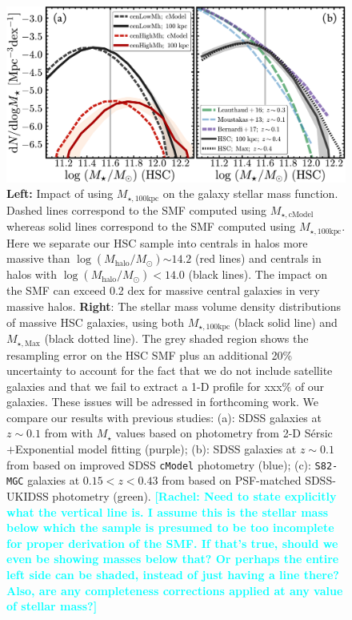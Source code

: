 \documentclass[a4paper,fleqn,usenatbib]{mnras}
\def\ser{{S\'{e}rsic\ }}
\def\mstar{{$M_{\star}$}}
\def\logmh{{$\log (M_{\mathrm{halo}}/M_{\odot})$}}
\def\mtot{{$M_{\star,100\mathrm{kpc}}$}}
\def\mmax{{$M_{\star,\mathrm{Max}}$}}
\def\mcmodel{{$M_{\star,\mathrm{cModel}}$}}
\newcommand{\rachel}[1]{\textcolor{cyan}{\textbf{[Rachel: #1]}}}
\begin{document}
  \begin{figure}
      \centering 
      \includegraphics[width=\textwidth]{fig/redbcg_mass_smf}
      \caption{
          \textbf{Left:} Impact of using \mtot{} on the galaxy stellar mass function. 
          Dashed lines correspond to the SMF computed using \mcmodel{} whereas solid 
          lines correspond to the SMF computed using \mtot{}. 
          Here we separate our HSC sample into  centrals in halos more massive than
          \logmh{}$\sim14.2$ (red lines) and centrals in halos with \logmh{}$<14.0$ 
          (black lines).
          The impact on the SMF can exceed 0.2 dex for massive central galaxies in 
          very massive halos.
          \textbf{Right}: The stellar mass volume density distributions of massive 
          HSC galaxies, using both \mtot{} (black solid line) and \mmax{} (black dotted 
          line).  
          The grey shaded region shows the resampling error on the HSC SMF plus an additional 20\%
          uncertainty to account for the fact that  we do not include satellite galaxies and that we fail to extract a 1-D profile for xxx\% of our galaxies. These issues will be adressed in forthcoming work. We compare our results with previous studies: 
          (a): SDSS galaxies at $z{\sim} 0.1$ from \citet{Bernardi2017} with \mstar{} 
          values based on photometry from 2-D \ser{}$+$Exponential model fitting 
          (purple); 
          (b): SDSS galaxies at $z{\sim} 0.1$ from \citet{Moustakas13} based on 
          improved SDSS \texttt{cModel} photometry (blue); 
          (c): \texttt{S82-MGC} galaxies at $0.15 < z< 0.43$ from 
          \citet{Leauthaud2016} based on PSF-matched SDSS-UKIDSS photometry (green).
          \rachel{Need to state explicitly what the vertical line is.  I assume this is the stellar mass below which the sample is presumed to be too incomplete for proper derivation of the SMF.  If that's true, should we even be showing masses below that?  Or perhaps the entire left side can be shaded, instead of just having a line there?  Also, are any completeness corrections applied at any value of stellar mass?}}
      \label{fig:smf}
  \end{figure}
\end{document}

